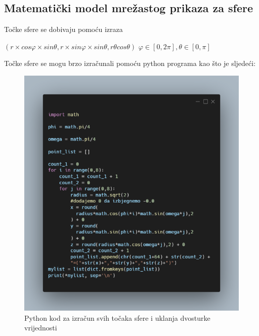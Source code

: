 \documentclass[a4paper,12pt]{article}
\newcommand\tab[1][1cm]{\hspace*{#1}}
\begin{document}
\clearpage
\subsection{Matematički model mrežastog prikaza za sfere}

Točke sfere se dobivaju pomoću izraza 
\begin{center}
$(r \times cos \varphi \times sin \theta, r \times sin\varphi \times sin\theta, r \theta cos \theta)$ \tab $\varphi \in [0, 2\pi],\theta \in [0, \pi]$
\end{center}
Točke sfere se mogu brzo izračunali pomoću python programa kao što je sljedeći:
\begin{figure}[ht]
    \centering
    \includegraphics[scale=0.65]{image/python.png}
    \caption{Python kod za izračun svih točaka sfere i uklanja dvosturke vrijednosti}
    
\end{figure}
\end{document}
